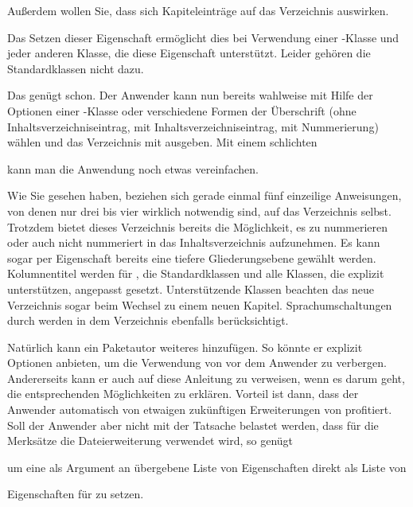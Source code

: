 Außerdem wollen Sie, dass sich Kapiteleinträge auf das
Verzeichnis auswirken.
\begin{lstcode}
\end{lstcode}
Das Setzen dieser Eigenschaft ermöglicht dies bei Verwendung einer
\KOMAScript-Klasse und jeder anderen Klasse, die diese Eigenschaft
unterstützt. Leider gehören die Standardklassen nicht dazu.

Das genügt schon. Der Anwender kann nun bereits
wahlweise mit Hilfe der Optionen einer \KOMAScript-Klasse oder
 verschiedene Formen der Überschrift (ohne
Inhaltsverzeichniseintrag, mit Inhaltsverzeichniseintrag, mit Nummerierung)
wählen und das Verzeichnis mit
 ausgeben. Mit einem
schlichten
\begin{lstcode}
  \newcommand*{\listofremarkboxes}{\listoftoc{lor}}
\end{lstcode}
kann man die Anwendung noch etwas vereinfachen.

Wie Sie gesehen haben, beziehen sich gerade einmal fünf einzeilige
Anweisungen, von denen nur drei bis vier wirklich notwendig sind, auf das
Verzeichnis selbst. Trotzdem bietet dieses Verzeichnis bereits die
Möglichkeit, es zu nummerieren oder auch nicht nummeriert in das
Inhaltsverzeichnis aufzunehmen. Es kann sogar per Eigenschaft bereits eine
tiefere Gliederungsebene gewählt werden. Kolumnentitel werden für \KOMAScript,
die Standardklassen und alle Klassen, die  explizit
unterstützen, angepasst gesetzt. Unterstützende Klassen beachten das neue
Verzeichnis sogar beim Wechsel zu einem neuen Kapitel. Sprachumschaltungen
durch  werden in dem Verzeichnis ebenfalls berücksichtigt.

Natürlich kann ein Paketautor weiteres
hinzufügen. So könnte er explizit Optionen anbieten, um die Verwendung von
 vor dem Anwender zu verbergen. Andererseits
kann er auch auf diese Anleitung zu  verweisen, wenn es
darum geht, die entsprechenden Möglichkeiten zu erklären. Vorteil ist dann,
dass der Anwender automatisch von etwaigen zukünftigen Erweiterungen von
 profitiert. Soll der Anwender aber nicht mit der Tatsache
belastet werden, dass für die Merksätze die Dateierweiterung 
verwendet wird, so genügt
\begin{lstcode}
  \newcommand*{\setupremarkboxes}{\setuptoc{lor}}
\end{lstcode}
\iftrue%
um eine als Argument an  übergebene Liste von
Eigenschaften direkt als Liste von %
\else%
um über \Macro{setupremarkboxes}
\fi
Eigenschaften für  zu setzen.


